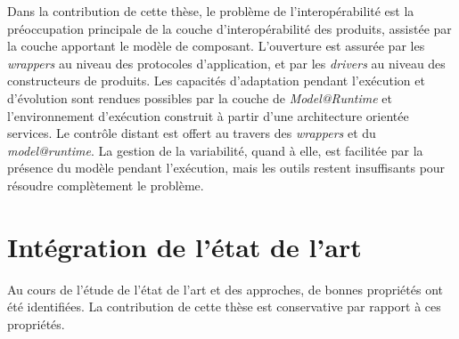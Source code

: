 Dans la contribution de cette thèse, le problème de l'interopérabilité est la préoccupation principale de la couche d'interopérabilité des produits, assistée par la couche apportant le modèle de composant. L'ouverture est assurée par les {\it wrappers} au niveau des protocoles d'application, et par les {\it drivers} au niveau des constructeurs de produits. Les capacités d'adaptation pendant l'exécution et d'évolution sont rendues possibles par la couche de \textit{Model@Runtime} et l'environnement d'exécution construit à partir d'une architecture orientée services. Le contrôle distant est offert au travers des {\it wrappers} et du \textit{model@runtime}. La gestion de la variabilité, quand à elle, est facilitée par la présence du modèle pendant l'exécution, mais les outils restent insuffisants pour résoudre complètement le problème.

\section{Intégration de l'état de l'art}

Au cours de l'étude de l'état de l'art et des approches, de bonnes propriétés ont été identifiées. La contribution de cette thèse est conservative par rapport à ces propriétés.\\

